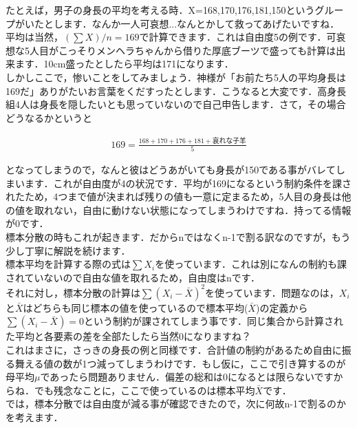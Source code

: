 \documentclass[11pt,a4paper,uplatex]{ujreport} 	%
\begin{document}
たとえば，男子の身長の平均を考える時．X={168,170,176,181,150}というグループがいたとします．なんか一人可哀想...なんとかして救ってあげたいですね．\\

平均は当然，$(\sum X) /n= 169$で計算できます．これは自由度5の例です．可哀想な5人目がこっそりメンヘラちゃんから借りた厚底ブーツで盛っても計算は出来ます．10cm盛ったとしたら平均は171になります．\\

しかしここで，惨いことをしてみましょう．神様が「お前たち5人の平均身長は169だ」ありがたいお言葉をくだすったとします．こうなると大変です．高身長組4人は身長を隠したいとも思っていないので自己申告します．さて，その場合どうなるかというと

\begin{align}
  169 = \frac{168+170+176+181+\text{哀れな子羊}}{5}
\end{align}

となってしまうので，なんと彼はどうあがいても身長が150である事がバレてしまいます．これが自由度が4の状況です．平均が169になるという制約条件を課されたため，4つまで値が決まれば残りの値も一意に定まるため，5人目の身長は他の値を取れない，自由に動けない状態になってしまうわけですね．持ってる情報が0です．\\

標本分散の時もこれが起きます．だからnではなくn-1で割る訳なのですが，もう少し丁寧に解説を続けます．\\

標本平均を計算する際の式は$\sum X_i$を使っています．これは別になんの制約も課されていないので自由な値を取れるため，自由度はnです．\\

それに対し，標本分散の計算は$\sum (X_i -\bar{X})^2$を使っています．問題なのは，$X_i$と$\bar{X}$はどちらも同じ標本の値を使っているので標本平均($\bar{X}$)の定義から$\sum (X_i - \bar{X}) = 0$という制約が課されてしまう事です．同じ集合から計算された平均と各要素の差を全部たしたら当然0になりますね？\\

これはまさに，さっきの身長の例と同様です．合計値の制約があるため自由に振る舞える値の数が1つ減ってしまうわけです．もし仮に，ここで引き算するのが母平均$\mu$であったら問題ありません．偏差の総和は0になるとは限らないですからね．でも残念なことに，ここで使っているのは標本平均$\bar{X}$です．\\

では，標本分散では自由度が減る事が確認できたので，次に何故n-1で割るのかを考えます．\\
\end{document}
